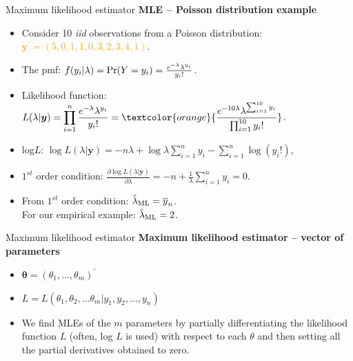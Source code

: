 \documentclass{beamer}
\begin{document}
\begin{frame}{Maximum likelihood estimator}
\textbf{MLE -- Poisson distribution example}\\ \smallskip
\begin{itemize}
    \item Consider 10 \textit{iid} observations from a Poisson distribution:\\\textcolor{orange}{$\bm{y}^{\prime}=(5,0,1,1,0,3,2,3,4,1)$}.
    \smallskip
    \item The pmf: $f(y_i|\lambda) = \textnormal{Pr}(Y=y_i) = \frac{e^{-\lambda}\lambda^{y_i}}{y_i!}$.
    \smallskip
    \item Likelihood function: $L(\lambda|\bm{y})=\displaystyle\prod_{i=1}^{n} \frac{e^{-\lambda}\lambda^{y_i}}{y_i!} = \textcolor{orange}{\frac{e^{-10\lambda}\lambda^{\sum_{i=1}^{10}y_i}}{\prod_{i=1}^{10}y_i!}}$.
    \smallskip
    \item log$L$: $\log L(\lambda|\bm{y}) = -n \lambda + \log \lambda \displaystyle\sum_{i=1}^n y_i - \displaystyle\sum_{i=1}^n \log ({y_i !})$,
    \smallskip
    \item $1^{st}$ order condition:
$\frac{\partial \log L(\lambda|\bm{y}) }{\partial \lambda} = -n + \frac{1}{\lambda} \displaystyle\sum_{i=1}^n y_i = 0 $.
\smallskip
    \item From $1^{st}$ order condition: $\hat{\lambda}_{\textnormal{ML}}=\overline{y}_n$. \\For our empirical example: \textcolor{orange}{$\hat{\lambda}_{\textnormal{ML}}=2$}.
\end{itemize}
\end{frame}
\begin{frame}{Maximum likelihood estimator}
\textbf{\textbf{Maximum likelihood estimator -- vector of parameters}}\\
\medskip
\begin{itemize}
\item $\bm{\theta} = (\theta_1, \dots , \theta_m)^{\prime}$
\medskip
\item $L=L(\theta_1, \theta_2, ... \theta_m | y_1, y_2, ... , y_n)$
\medskip
\item We find MLEs of the $m$ parameters by partially differentiating the likelihood function $L$ (often, log $L$ is used) with respect to each $\theta$ and then setting all the partial derivatives obtained to zero.
\end{itemize}
\end{frame}
\end{document}
